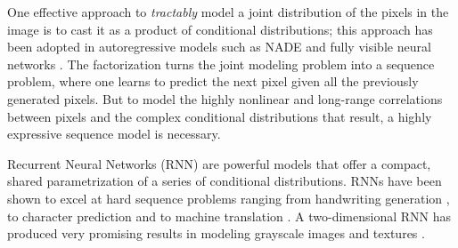 One effective approach to \emph{tractably} model a joint distribution of the pixels in the image is to cast it as a product of conditional distributions; this approach has been adopted in autoregressive models such as NADE \cite{larochelle2011} and fully visible neural networks \cite{neal1992connectionist, Bengio_Bengio_NIPS99}. The factorization turns the joint modeling problem into a sequence problem, where one learns to predict the next pixel given all the previously generated pixels. But to model the highly nonlinear and long-range correlations between pixels and the complex conditional distributions that result, a highly expressive sequence model is necessary.

Recurrent Neural Networks (RNN) are powerful models that offer a compact, shared parametrization of a series of conditional distributions. RNNs have been shown to excel at hard sequence problems ranging from handwriting generation \cite{DBLP:journals/corr/Graves13}, to character prediction \cite{sutskever2011generating} and to machine translation \cite{kalchbrenner13emnlp}. A two-dimensional RNN has produced very promising results in modeling grayscale images and textures \cite{theis2015generative}. 

